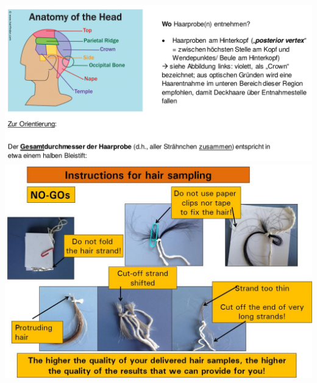 \includegraphics[width=\textwidth]{./media/SOP_Haarprobe_Hinweise_2.png}
\includegraphics[width=\textwidth]{./media/SOP_Haarprobe_NoGos.png}


